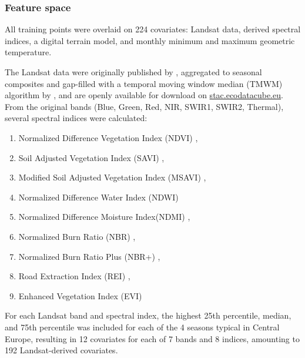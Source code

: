     \subsubsection{Feature space}
        All training points were overlaid on 224 covariates: Landsat data, derived spectral indices, a digital terrain model, and monthly minimum and maximum geometric temperature. 
        
        The Landsat data were originally published by \citet{potapov2020landsat}, aggregated to seasonal composites and gap-filled with a temporal moving window median (TMWM) algorithm by \citet{witjes2023ecodatacube}, and are openly available for download on \url{stac.ecodatacube.eu}. From the original bands (Blue, Green, Red, NIR, SWIR1, SWIR2, Thermal), several spectral indices were calculated: 
        \begin{enumerate}
            \item Normalized Difference Vegetation Index (NDVI) \citep{rouse1974monitoring}, 
            \item Soil Adjusted Vegetation Index (SAVI) \citep{huete1988soil}, 
            \item Modified Soil Adjusted Vegetation Index (MSAVI) \citep{qi1994msavi}, 
            \item Normalized Difference Water Index (NDWI)  \citep{mcfeeters1996use}
            \item Normalized Difference Moisture Index(NDMI) \citep{gao1996ndwi},
            \item Normalized Burn Ratio (NBR) \citep{garcia1991mapping}, 
            \item Normalized Burn Ratio Plus (NBR+) \citep{alcaras2022normalized},
            \item Road Extraction Index (REI) \citep{shahi2015novel}, 
            \item Enhanced Vegetation Index (EVI) \citep{liu1995feedback}
        \end{enumerate}
        For each Landsat band and spectral index, the highest 25th percentile, median, and 75th percentile was included for each of the 4 seasons typical in Central Europe, resulting in 12 covariates for each of 7 bands and 8 indices, amounting to 192 Landsat-derived covariates.

